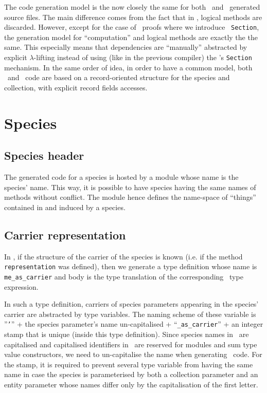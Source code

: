 
The code generation model is the now closely the same for both \ocaml\
and \coq\ generated source files. The main difference comes from the
fact that in \ocaml, logical methods are discarded. However, except
for the case of \zenon\ proofs where we introduce \coq\ {\tt Section},
the generation model for ``computation'' and logical methods are
exactly the the same. This especially means that dependencies are
``manually'' abstracted by explicit $\lambda$-lifting instead of using
(like in the previous compiler) the \coq's {\tt Section}
mechanism. In the same order of idea, in order to have a common model,
both \ocaml\ and \coq\ code are based on a record-oriented structure
for the species and collection, with explicit record fields accesses.

\section{Species}

\subsection{Species header}
The generated code for a species is hosted by a module whose name is
the species' name. This way, it is possible to have species having the
same names of methods without conflict. The module hence defines the
name-space of ``things'' contained in and induced by a species.


\subsection{Carrier representation}
In \ocaml, if the structure of the carrier of the species is known
(i.e. if the method {\tt representation} was defined), then we
generate a type definition whose name is {\tt me\_as\_carrier} and
body is the type translation of the corresponding \focalize\ type
expression.

In such a type definition, carriers of species parameters appearing in
the species' carrier are abstracted by type variables. The naming
scheme of these variable is ''{\tt '}'' + the species parameter's name
un-capitalised + ``{\tt \_as\_carrier}'' + an integer stamp that is
unique (inside this type definition). Since species names in
\focalize\ are capitalised and capitalised identifiers in \ocaml\ are
reserved for modules and sum type value constructors, we need to
un-capitalise the name when generating \ocaml\ code. For the stamp, it
is required to prevent several type variable from having the same name
in case the species is parameterised by both a collection parameter
and an entity parameter whose names differ only by the capitalisation
of the first letter.

